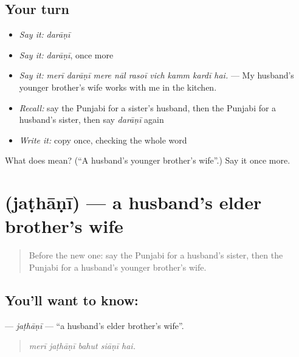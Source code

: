 \subsection*{Your turn}
\begin{itemize}
\raggedright
  \item \emph{Say it:} \emph{darāṇī}
  \item \emph{Say it:} \emph{darāṇī}, once more
  \item \emph{Say it:} \emph{merī darāṇī mere nāl rasoī vich kamm kardī hai.} — My husband's younger brother's wife works with me in the kitchen.
  \item \emph{Recall:} say the Punjabi for a sister's husband, then the Punjabi for a husband's sister, then say \emph{darāṇī} again
  \item \emph{Write it:} copy \textbf{} once, checking the whole word
\end{itemize}

\begin{tcolorbox}[breakable,colback=teal!4,colframe=teal!35!black,title={Before you move on}]
What does  mean? (\textquotedblleft{}A husband's younger brother's wife\textquotedblright{}.) Say it once more.
\end{tcolorbox}
\section[\texorpdfstring{\pa{ਜਠਾਣੀ} (jaṭhāṇī)}{ਜਠਾਣੀ (jaṭhāṇī)}]{ (jaṭhāṇī) — a husband's elder brother's wife}

\label{lesson:PA-C330-jathani}



\begin{quote}
Before the new one: say the Punjabi for a husband's sister, then the Punjabi for a husband's younger brother's wife.
\end{quote}

\subsection*{You'll want to know: }
\textbf{} — \emph{jaṭhāṇī} — \textquotedblleft{}a husband's elder brother's wife\textquotedblright{}.

\begin{quote}
    
\end{quote}

\begin{quote}
\emph{merī jaṭhāṇī bahut siāṇī hai.}
\end{quote}

